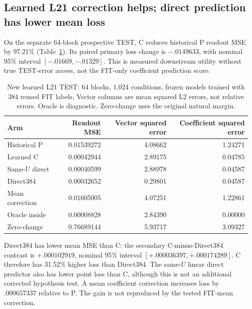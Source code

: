 \subsection{Learned L21 correction helps; direct prediction has lower mean loss}\label{sec:learnedresults}

On the separate 64-block prospective TEST, C reduces historical P readout MSE by 97.21\% (Table~\ref{tab:learnedL21}). Its paired primary loss change is $-.0149633$, with nominal 95\% interval $[-.01669,-.01329]$. This is measured downstream utility without true TEST-error access, not the FIT-only coefficient prediction score.

\begin{table}[ht]\centering\small

\begin{tabular}{lrrr}\toprule Arm & Readout MSE & Vector squared error & Coefficient squared error\\\midrule

Historical P & 0.01539272 & 4.08662 & 1.24271\\

Learned C & 0.00042944 & 2.89175 & 0.04785\\

Same-$U$ direct & 0.00040599 & 2.88978 & 0.04587\\

Direct384 & 0.00032652 & 0.29801 & 0.04587\\

Mean correction & 0.01605005 & 4.07251 & 1.22861\\

Oracle inside & 0.00008828 & 2.84390 & 0.00000\\

Zero-change & 0.76689144 & 5.93717 & 3.09327\\

\bottomrule\end{tabular}

\caption{New learned L21 TEST: 64 blocks, 1,024 conditions, frozen models trained with 384 reused FIT labels. Vector columns are mean squared L2 errors, not relative errors. Oracle is diagnostic. Zero-change uses the original natural margin.}\label{tab:learnedL21}

\end{table}

Direct384 has lower mean MSE than C: the secondary C-minus-Direct384 contrast is $+.000102919$, nominal 95\% interval $[+.000036397,+.000174289]$. C therefore has 31.52\% higher loss than Direct384. The same-$U$ linear direct predictor also has lower point loss than C, although this is not an additional corrected hypothesis test. A mean coefficient correction increases loss by $.000657337$ relative to P. The gain is not reproduced by the tested FIT-mean correction.


